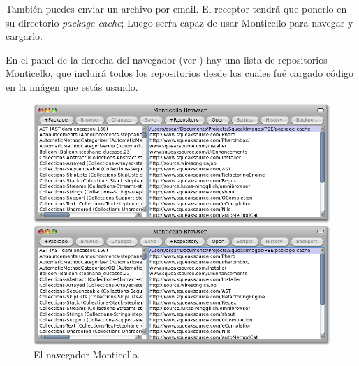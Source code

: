 \documentclass[a4paper,10pt,twoside]{book}
\begin{document}
Tambi\'en puedes enviar un archivo  por email.
El receptor tendr\'a que ponerlo en su directorio \emph{package-cache}; Luego ser\'ra capaz de usar Monticello para navegar y cargarlo.


En el panel de la derecha del navegador (ver ) hay una lista de repositorios Monticello, que incluir\'a todos los repositorios desde los cuales fu\'e cargado c\'odigo en la im\'agen que est\'as usando.


\begin{figure}[hbt]
\ifluluelse
	{\centerline {\includegraphics[width=\textwidth]{MonticelloBrowser}}}
	{\centerline {\includegraphics[scale=0.7]{MonticelloBrowser}}}
\caption{El navegador Monticello.
}
\end{figure}
\end{document}
